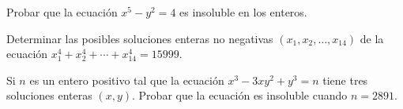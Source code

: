 \begin{exercise}
    Probar que la ecuación $x^5 - y^2 = 4$ es insoluble en los enteros.
\end{exercise}

\begin{exercise}
    Determinar las posibles soluciones enteras no negativas $(x_1, x_2, \ldots, x_{14})$ de la ecuación $x_1^4 + x_2^4 + \cdots + x_{14}^4 = 15999$.
\end{exercise}

\begin{exercise}
    Si $n$ es un entero positivo tal que la ecuación $x^3 - 3xy^2 + y^3 = n$ tiene tres soluciones enteras $(x,y)$.
    Probar que la ecuación es insoluble cuando $n = 2891$.
\end{exercise}